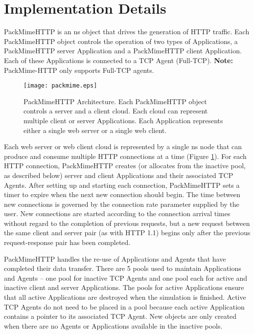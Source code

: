 \section{Implementation Details}
PackMimeHTTP is an ns object that drives the generation of HTTP
traffic. Each PackMimeHTTP object controls the operation of two types
of Applications, a PackMimeHTTP server Application and a PackMimeHTTP
client Application. Each of these Applications is connected to a TCP
Agent (Full-TCP).   {\bf Note:} PackMime-HTTP only supports Full-TCP
agents. 

\begin{figure}
\centering
\texttt{[image: packmime.eps]}
\label{fig-pm}
\caption{PackMimeHTTP Architecture. Each PackMimeHTTP object controls
a server and a client cloud. Each cloud can represent multiple client
or server Applications. Each Application represents either a single
web server or a single web client.} 
\end{figure}  

Each web server or web client cloud is represented by a single ns node
that can produce and consume multiple HTTP connections at a time
(Figure \ref{fig-pm}). For each HTTP connection, PackMimeHTTP creates (or
allocates from the inactive pool, as described below) server and
client Applications and their associated TCP Agents. After setting up
and starting each connection, PackMimeHTTP sets a timer to expire when
the next new connection should begin. The time between new connections
is governed by the connection rate parameter supplied by the user. New
connections are started according to the connection arrival times
without regard to the completion of previous requests, but a new
request between the same client and server pair (as with HTTP 1.1)
begins only after the previous request-response pair has been
completed. 

PackMimeHTTP handles the re-use of Applications and Agents that have
completed their data transfer. There are 5 pools used to maintain
Applications and Agents -- one pool for inactive TCP Agents and one
pool each for active and inactive client and server Applications. The
pools for active Applications ensure that all active Applications are
destroyed when the simulation is finished. Active TCP Agents do not
need to be placed in a pool because each active Application contains a
pointer to its associated TCP Agent. New objects are only created when
there are no Agents or Applications available in the inactive pools. 

